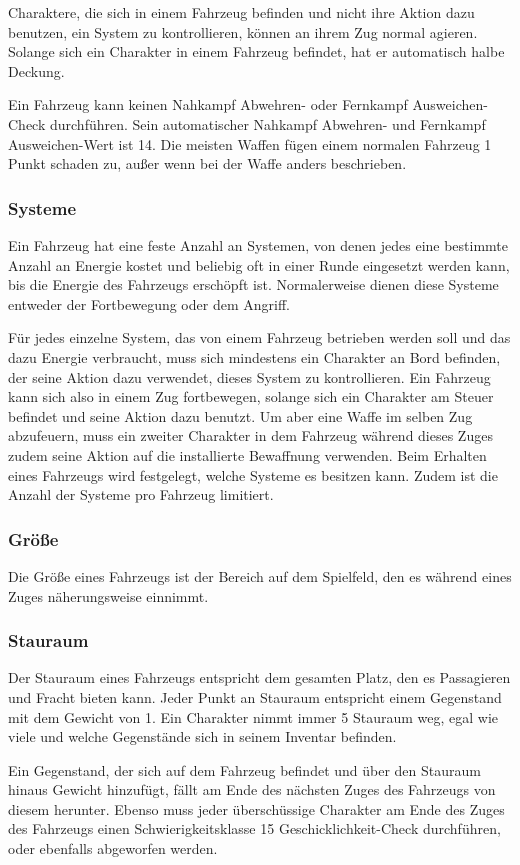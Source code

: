 Charaktere, die sich in einem Fahrzeug befinden und nicht ihre Aktion dazu benutzen, ein System zu kontrollieren, können an ihrem Zug normal agieren. Solange sich ein Charakter in einem Fahrzeug befindet, hat er automatisch halbe Deckung.

Ein Fahrzeug kann keinen Nahkampf Abwehren- oder Fernkampf Ausweichen-Check durchführen. Sein automatischer Nahkampf Abwehren- und Fernkampf Ausweichen-Wert ist 14.
Die meisten Waffen fügen einem normalen Fahrzeug 1 Punkt schaden zu, außer wenn bei der Waffe anders beschrieben.
\subsubsection{Systeme}
Ein Fahrzeug hat eine feste Anzahl an Systemen, von denen jedes eine bestimmte Anzahl an Energie kostet und beliebig oft in einer Runde eingesetzt werden kann, bis die Energie des Fahrzeugs erschöpft ist. Normalerweise dienen diese Systeme entweder der Fortbewegung oder dem Angriff.

Für jedes einzelne System, das von einem Fahrzeug betrieben werden soll und das dazu Energie verbraucht, muss sich mindestens ein Charakter an Bord befinden, der seine Aktion dazu verwendet, dieses System zu kontrollieren. Ein Fahrzeug kann sich also in einem Zug fortbewegen, solange sich ein Charakter am Steuer befindet und seine Aktion dazu benutzt. Um aber eine Waffe im selben Zug abzufeuern, muss ein zweiter Charakter in dem Fahrzeug während dieses Zuges zudem seine Aktion auf die installierte Bewaffnung verwenden.
Beim Erhalten eines Fahrzeugs wird festgelegt, welche Systeme es besitzen kann. Zudem ist die Anzahl der Systeme pro Fahrzeug limitiert.
\subsubsection{Größe}
Die Größe eines Fahrzeugs ist der Bereich auf dem Spielfeld, den es während eines Zuges näherungsweise einnimmt.
\subsubsection{Stauraum}
Der Stauraum eines Fahrzeugs entspricht dem gesamten Platz, den es Passagieren und Fracht bieten kann. Jeder Punkt an Stauraum entspricht einem Gegenstand mit dem Gewicht von 1.
Ein Charakter nimmt immer 5 Stauraum weg, egal wie viele und welche Gegenstände sich in seinem Inventar befinden.

Ein Gegenstand, der sich auf dem Fahrzeug befindet und über den Stauraum hinaus Gewicht hinzufügt, fällt am Ende des nächsten Zuges des Fahrzeugs von diesem herunter. Ebenso muss jeder überschüssige Charakter am Ende des Zuges des Fahrzeugs einen Schwierigkeitsklasse 15 Geschicklichkeit-Check durchführen, oder ebenfalls abgeworfen werden.
